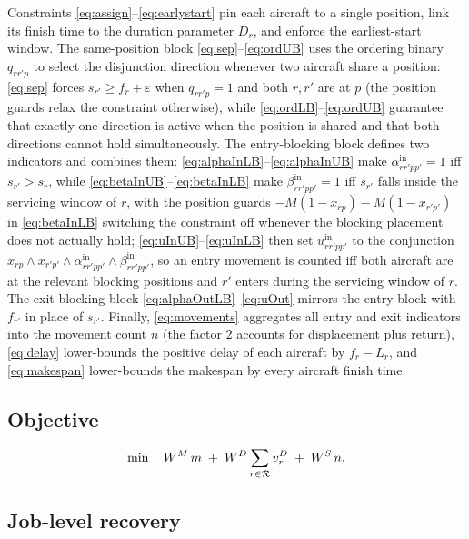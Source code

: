 Constraints \eqref{eq:assign}--\eqref{eq:earlystart} pin each aircraft to
a single position, link its finish time to the duration parameter $D_r$,
and enforce the earliest-start window.  The same-position block
\eqref{eq:sep}--\eqref{eq:ordUB} uses the ordering binary $q_{rr'p}$ to
select the disjunction direction whenever two aircraft share a position:
\eqref{eq:sep} forces $s_{r'} \ge f_r + \varepsilon$ when $q_{rr'p} = 1$
and both $r, r'$ are at $p$ (the position guards relax the constraint
otherwise), while \eqref{eq:ordLB}--\eqref{eq:ordUB} guarantee that
exactly one direction is active when the position is shared and that
both directions cannot hold simultaneously.  The entry-blocking block
defines two indicators and combines them:
\eqref{eq:alphaInLB}--\eqref{eq:alphaInUB} make
$\alpha^{\mathrm{in}}_{rr'pp'} = 1$ iff $s_{r'} > s_r$, while
\eqref{eq:betaInUB}--\eqref{eq:betaInLB} make
$\beta^{\mathrm{in}}_{rr'pp'} = 1$ iff $s_{r'}$ falls inside the
servicing window of $r$, with the position guards
$-M(1 - x_{rp}) - M(1 - x_{r'p'})$ in \eqref{eq:betaInLB} switching the
constraint off whenever the blocking placement does not actually hold;
\eqref{eq:uInUB}--\eqref{eq:uInLB} then set $u^{\mathrm{in}}_{rr'pp'}$ to
the conjunction $x_{rp} \wedge x_{r'p'} \wedge
\alpha^{\mathrm{in}}_{rr'pp'} \wedge \beta^{\mathrm{in}}_{rr'pp'}$, so an
entry movement is counted iff both aircraft are at the relevant blocking
positions and $r'$ enters during the servicing window of $r$.  The
exit-blocking block \eqref{eq:alphaOutLB}--\eqref{eq:uOut} mirrors the
entry block with $f_{r'}$ in place of $s_{r'}$.  Finally,
\eqref{eq:movements} aggregates all entry and exit indicators into the
movement count $n$ (the factor $2$ accounts for displacement plus
return), \eqref{eq:delay} lower-bounds the positive delay of each
aircraft by $f_r - L_r$, and \eqref{eq:makespan} lower-bounds the
makespan by every aircraft finish time.

\subsection*{Objective}
\begin{equation}
  \min \quad W^M\, m
         \;+\; W^D \sum_{r \in \mathcal{R}} v^D_r
         \;+\; W^S\, n.
  \label{eq:milpobj}
\end{equation}

\subsection{Job-level recovery}
\label{sec:job_recovery}

